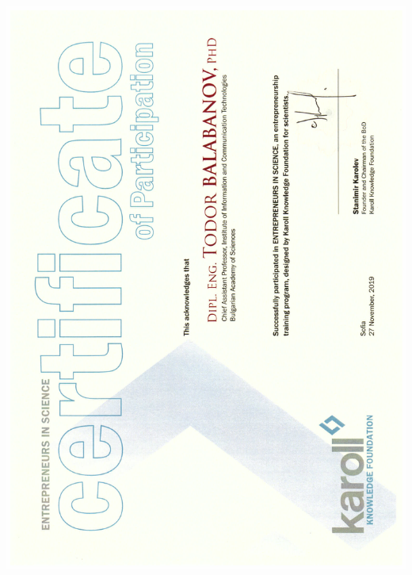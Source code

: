 \documentclass[english,a4paper]{europasscv}
\begin{document}
\includegraphics[width=\textwidth,height=\textheight,keepaspectratio]{Karoll2019}
\end{document}
